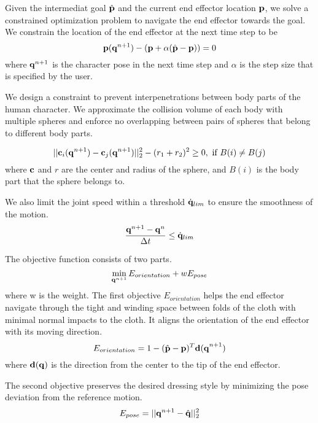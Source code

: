 Given the intermediat goal $\hat{\mathbf{p}}$ and the current end effector location $\mathbf{p}$, we solve a constrained optimization problem to navigate the end effector towards the goal. We constrain the location of the end effector at the next time step to be
\begin{displaymath}
\mathbf{p}(\mathbf{q}^{n+1})-(\mathbf{p}+\alpha(\hat{\mathbf{p}} - \mathbf{p})) = 0
\end{displaymath}
where $\mathbf{q}^{n+1}$ is the character pose in the next time step and $\alpha$ is the step size that is specified by the user.

We design a constraint to prevent interpenetrations between body parts of the human character. We approximate the collision volume of each body with multiple spheres and enforce no overlapping between pairs of spheres that belong to different body parts.

\begin{displaymath}
||\mathbf{c}_i(\mathbf{q}^{n+1}) - \mathbf{c}_j(\mathbf{q}^{n+1})||_2^2 - (r_1 + r_2)^2 \geq 0,\mbox{ if }B(i) \neq B(j)
\end{displaymath}
where $\mathbf{c}$ and $r$ are the center and radius of the sphere, and $B(i)$ is the body part that the sphere belongs to.

We also limit the joint speed within a threshold $\dot{\mathbf{q}}_{lim}$ to ensure the smoothness of the motion.
\begin{displaymath}
\frac{\mathbf{q}^{n+1} - \mathbf{q}^n}{\Delta t} \leq \dot{\mathbf{q}}_{lim}
\end{displaymath}

The objective function consists of two parts.
\begin{displaymath}
\min_{\mathbf{q}^{n+1}} E_{orientation} + wE_{pose}
\end{displaymath}
where w is the weight. The first objective $E_{orientation}$ helps the end effector navigate through the tight and winding space between folds of the cloth with minimal normal impacts to the cloth. It aligns the orientation of the end effector with its moving direction.
\begin{displaymath}
E_{orientation} = 1-(\hat{\mathbf{p}}-\mathbf{p})^T\mathbf{d(q}^{n+1})
\end{displaymath}
where $\mathbf{d(q)}$ is the direction from the center to the tip of the end effector.

The second objective preserves the desired dressing style by minimizing the pose deviation from the reference motion.
\begin{displaymath}
E_{pose} = ||\mathbf{q}^{n+1}-\hat{\mathbf{q}}||_2^2
\end{displaymath}


